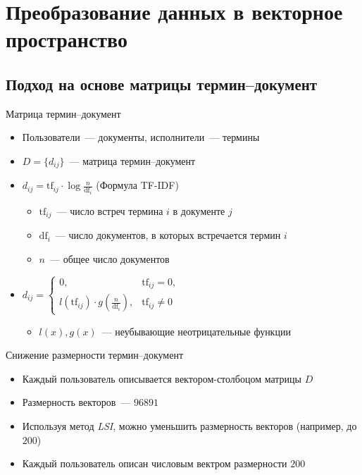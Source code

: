 \documentclass{beamer}
\begin{document}
\section{Преобразование данных в векторное пространство}

\subsection{Подход на основе матрицы термин--документ}

\begin{frame}{Матрица термин--документ}
  \begin{itemize}
      \item {Пользователи~--- документы, исполнители~--- термины}
      \item {$D = \{d_{ij}\}$~--- матрица термин--документ}
      \pause
      \item {$d_{ij} = \mathrm{tf}_{ij} \cdot \log{\frac{n}{\mathrm{df}_{i}}}$ (Формула TF-IDF)}
          \begin{itemize}
              \item $\mathrm{tf}_{ij}$~--- число встреч термина $i$ в документе $j$
              \item $\mathrm{df}_{i}$~--- число документов, в которых встречается термин $i$
              \item $n$~--- общее число документов
          \end{itemize}
      \pause
      \item {$d_{ij} = \begin{cases}
          0,& \mathrm{tf}_{ij} = 0,\\
          l(\mathrm{tf}_{ij}) \cdot g(\frac{n}{\mathrm{df}_{i}}),& \mathrm{tf}_{ij} \ne 0
      \end{cases}$}
          \begin{itemize}
              \item {$l(x), g(x)$~--- неубывающие неотрицательные функции}
          \end{itemize}
  \end{itemize}
\end{frame}

\begin{frame}{Снижение размерности термин--документ}
  \begin{itemize}
      \item {Каждый пользователь описывается вектором-столбоцом матрицы $D$}
      \pause
      \item {Размерность векторов~--- $96891$}
      \pause
      \item {Используя метод \textit{LSI}, можно уменьшить размерность векторов (например, до $200$)}
      \pause
      \item {Каждый пользователь описан числовым вектром размерности $200$}
  \end{itemize}
\end{frame}
\end{document}

